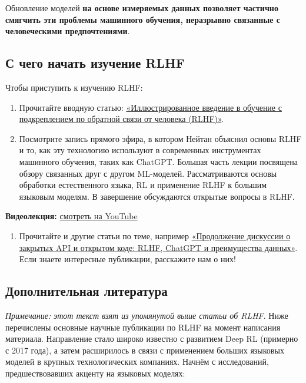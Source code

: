 \documentclass[11pt,a4paper]{article}
\begin{document}
Обновление моделей \textbf{на основе измеряемых данных позволяет частично смягчить эти проблемы машинного обучения, неразрывно связанные с человеческими предпочтениями}.

\subsection{С чего начать изучение RLHF}\label{start-learning-about-rlhf}

Чтобы приступить к изучению RLHF:

\begin{enumerate}
\def\labelenumi{\arabic{enumi}.}
\item
  Прочитайте вводную статью: \href{https://huggingface.co/blog/rlhf}{«Иллюстрированное введение в обучение с подкреплением по обратной связи от человека (RLHF)»}.
\item
  Посмотрите запись прямого эфира, в котором Нейтан объяснил основы RLHF и то, как эту технологию используют в современных инструментах машинного обучения, таких как ChatGPT. Большая часть лекции посвящена обзору связанных друг с другом ML-моделей. Рассматриваются основы обработки естественного языка, RL и применение RLHF к большим языковым моделям. В завершение обсуждаются открытые вопросы в RLHF.
\end{enumerate}

\textbf{Видеолекция:} \href{https://www.youtube.com/watch?v=2MBJOuVq380}{смотреть на YouTube}

\begin{enumerate}
\def\labelenumi{\arabic{enumi}.}
\setcounter{enumi}{2}
\tightlist
\item
  Прочитайте и другие статьи по теме, например \href{https://robotic.substack.com/p/rlhf-chatgpt-data-moats}{«Продолжение дискуссии о закрытых API и открытом коде: RLHF, ChatGPT и преимущества данных»}. Если знаете интересные публикации, расскажите нам о них!
\end{enumerate}

\subsection{Дополнительная литература}\label{additional-readings}

\emph{Примечание: этот текст взят из упомянутой выше статьи об RLHF}. Ниже перечислены основные научные публикации по RLHF на момент написания материала. Направление стало широко известно с развитием Deep RL (примерно с 2017 года), а затем расширилось в связи с применением больших языковых моделей в крупных технологических компаниях. Начнём с исследований, предшествовавших акценту на языковых моделях:
\end{document}
